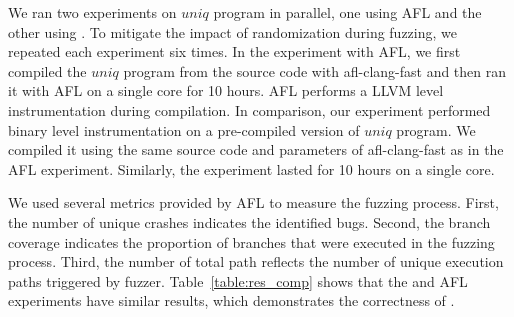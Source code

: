 We ran two experiments on $uniq$ program in parallel, one using AFL and the other using \sysname. To mitigate the impact of randomization during fuzzing, we repeated each experiment six times. In the experiment with AFL, we first compiled the $uniq$ program from the source code with afl-clang-fast and then ran it with AFL on a single core for 10 hours. AFL performs a LLVM level instrumentation during compilation. In comparison, our \sysname experiment performed binary level instrumentation on a pre-compiled version of $uniq$ program. We compiled it using the same source code and parameters of afl-clang-fast as in the AFL experiment. Similarly, the experiment lasted for 10 hours on a single core.

We used several metrics provided by AFL to measure the fuzzing process. First, the number of unique crashes indicates the identified bugs. Second, the branch coverage indicates the proportion of branches that were executed in the fuzzing process. Third, the number of total path reflects the number of unique execution paths triggered by fuzzer. Table~\ref{table:res_comp} shows that the \sysname and AFL experiments have similar results, which demonstrates the correctness of \sysname.





